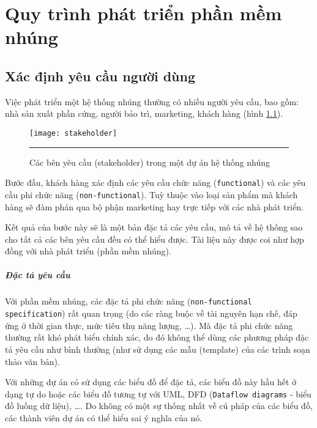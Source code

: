 \chapter{Quy trình phát triển phần mềm nhúng}

    \section{Xác định yêu cầu người dùng}
        Việc phát triển một hệ thống nhúng thường có nhiều người yêu cầu, bao
        gồm: nhà sản xuất phần cứng, người bảo trì, marketing, khách hàng (hình
        \ref{fig:stakeholder})\cite{EmbSysState}.

        \begin{figure}[H]
            \centering
            \texttt{[image: stakeholder]}
            \rule{35em}{0.5pt}
            \caption{Các bên yêu cầu (stakeholder) trong một dự án hệ thống nhúng}
            \label{fig:stakeholder}
        \end{figure}

        Bước đầu, khách hàng xác định các yêu cầu chức năng
        (\texttt{functional}) và các yêu cầu phi chức năng
        (\texttt{non-functional}). Tuỳ thuộc vào loại sản phẩm mà khách hàng sẽ
        đàm phán qua bộ phận marketing hay trực tiếp với các nhà phát triển.

        Kết quả của bước này sẽ là một bản đặc tả các yêu cầu, mô tả về hệ
        thống sao cho tất cả các bên yêu cầu đều có thể hiểu được. Tài liệu này
        được coi như hợp đồng với nhà phát triển (phần mềm nhúng).

        \paragraph{Đặc tả yêu cầu}

        Với phần mềm nhúng, các đặc tả phi chức năng (\texttt{non-functional
        specification}) rất quan trọng (do các ràng buộc về tài nguyên hạn chế,
        đáp ứng ở thời gian thực, mức tiêu thụ năng lượng, \ldots). Mà đặc tả
        phi chức năng thường rất khó phát biểu chính xác, do đó không
        thể dùng các phương pháp đặc tả yêu cầu như bình thường (như sử dụng
        các mẫu (template) của các trình soạn thảo văn bản).

        Với những dự án có sử dụng các biểu đồ để đặc tả, các biểu đồ này hầu
        hết ở dạng tự do hoặc các biểu đồ tương tự với UML, DFD
        (\texttt{Dataflow diagrams} - biểu đồ luồng dữ liệu), \ldots. Do không
        có một sự thống nhất về cú pháp của các biểu đồ, các thành viên dự án
        có thể hiểu sai ý nghĩa của nó.

